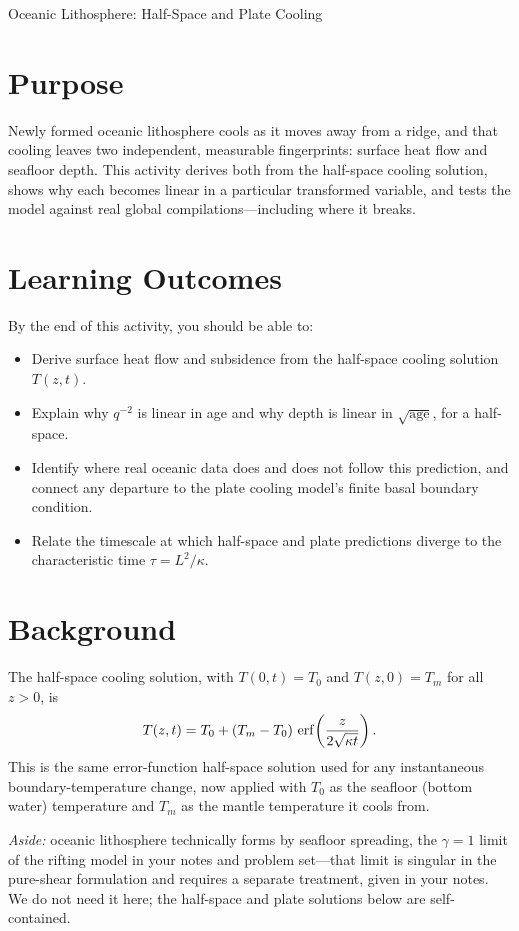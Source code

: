\begin{activity}{Oceanic Lithosphere: Half-Space and Plate Cooling}

\section*{Purpose}
Newly formed oceanic lithosphere cools as it moves away from a ridge, and that cooling leaves two independent, measurable fingerprints: surface heat flow and seafloor depth. This activity derives both from the half-space cooling solution, shows why each becomes linear in a particular transformed variable, and tests the model against real global compilations---including where it breaks.

\section*{Learning Outcomes}
By the end of this activity, you should be able to:
\begin{itemize}
    \item Derive surface heat flow and subsidence from the half-space cooling solution $T(z,t)$.
    \item Explain why $q^{-2}$ is linear in age and why depth is linear in $\sqrt{\text{age}}$, for a half-space.
    \item Identify where real oceanic data does and does not follow this prediction, and connect any departure to the plate cooling model's finite basal boundary condition.
    \item Relate the timescale at which half-space and plate predictions diverge to the characteristic time $\tau=L^2/\kappa$.
\end{itemize}

\section*{Background}
The half-space cooling solution, with $T(0,t)=T_0$ and $T(z,0)=T_m$ for all $z>0$, is
\[
    T(z,t) = T_0 + (T_m-T_0)\,\erf\!\left(\frac{z}{2\sqrt{\kappa t}}\right).
\]
This is the same error-function half-space solution used for any instantaneous boundary-temperature change, now applied with $T_0$ as the seafloor (bottom water) temperature and $T_m$ as the mantle temperature it cools from.

\emph{Aside:} oceanic lithosphere technically forms by seafloor spreading, the $\gamma=1$ limit of the rifting model in your notes and problem set---that limit is singular in the pure-shear formulation and requires a separate treatment, given in your notes. We do not need it here; the half-space and plate solutions below are self-contained.


\end{activity}
